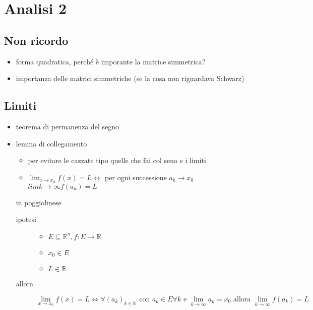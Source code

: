 \documentclass[11pt]{article}
\author{Biggus Diccus}
\date{\today}
\title{}
\begin{document}
\tableofcontents

\section{Analisi 2}
\label{sec:org72cb412}
\subsection{Non ricordo}
\label{sec:org31e5680}
\begin{itemize}
\item forma quadratica, perché è imporante la matrice simmetrica?
\item importanza delle matrici simmetriche (se la cosa non riguardava Schwarz)
\end{itemize}

\subsection{Limiti}
\label{sec:orga865acd}
\begin{itemize}
\item teorema di permanenza del segno
\item lemma di collegamento
\begin{itemize}
\item per evitare le cazzate tipo quelle che fai col seno e i limiti
\item \(\lim_{x \to x_0} f(x) = L \iff\) per ogni
successione \(a_k \to x_0\) \(lim{k \to \infty} f(a_k) = L\)
\end{itemize}
in poggiolinese
\begin{description}
\item[{ipotesi}] \begin{itemize}
\item \(E \subseteq \mathbb{R}^n, f : E \to \mathbb{R}\)
\item \(x_0 \in E\)
\item \(L \in \mathbb{R}\)
\end{itemize}
\item[{allora}] \[
     \lim_{x \to x_0} f(x) = L \iff
     \forall (a_k)_{k \in \mathbb{N}}
     \text{ con } a_k \in E \forall k \text{ e }
     \lim_{k \to \infty} a_k = x_0 \text{ allora }
     \lim_{k \to \infty} f(a_k) = L
     \]
\end{description}
\end{itemize}
\end{document}
